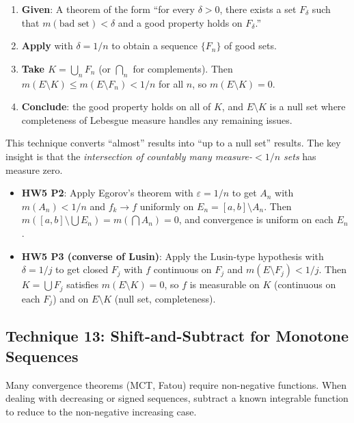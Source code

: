 \documentclass[11pt]{report}
\begin{document}
\begin{rembox}[Strategy]
\begin{enumerate}[label=(\roman*)]
\item \textbf{Given}: A theorem of the form ``for every $\delta > 0$, there exists a set $F_\delta$ such that $m(\text{bad set}) < \delta$ and a good property holds on $F_\delta$.''
\item \textbf{Apply} with $\delta = 1/n$ to obtain a sequence $\{F_n\}$ of good sets.
\item \textbf{Take $K = \bigcup_n F_n$} (or $\bigcap_n$ for complements). Then $m(E \setminus K) \leq m(E \setminus F_n) < 1/n$ for all $n$, so $m(E \setminus K) = 0$.
\item \textbf{Conclude}: the good property holds on all of $K$, and $E \setminus K$ is a null set where completeness of Lebesgue measure handles any remaining issues.
\end{enumerate}
This technique converts ``almost'' results into ``up to a null set'' results. The key insight is that the \textit{intersection of countably many measure-$< 1/n$ sets} has measure zero.
\end{rembox}

\begin{exbox}[{Applications (HW5)}]
\begin{itemize}
\item \textbf{HW5 P2}: Apply Egorov's theorem with $\varepsilon = 1/n$ to get $A_n$ with $m(A_n) < 1/n$ and $f_k \to f$ uniformly on $E_n = [a,b] \setminus A_n$. Then $m([a,b] \setminus \bigcup E_n) = m(\bigcap A_n) = 0$, and convergence is uniform on each $E_n$.
\item \textbf{HW5 P3 (converse of Lusin)}: Apply the Lusin-type hypothesis with $\delta = 1/j$ to get closed $F_j$ with $f$ continuous on $F_j$ and $m(E \setminus F_j) < 1/j$. Then $K = \bigcup F_j$ satisfies $m(E \setminus K) = 0$, so $f$ is measurable on $K$ (continuous on each $F_j$) and on $E \setminus K$ (null set, completeness).
\end{itemize}
\end{exbox}

\subsection{Technique 13: Shift-and-Subtract for Monotone Sequences}

Many convergence theorems (MCT, Fatou) require non-negative functions. When dealing with decreasing or signed sequences, subtract a known integrable function to reduce to the non-negative increasing case.
\end{document}
